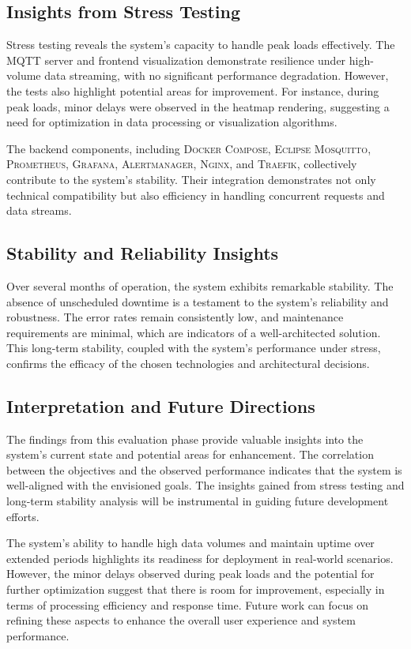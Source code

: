 \subsection{Insights from Stress Testing}
Stress testing reveals the system's capacity to handle peak loads effectively. The MQTT server and frontend visualization demonstrate resilience under high-volume data streaming, with no significant performance degradation. However, the tests also highlight potential areas for improvement. For instance, during peak loads, minor delays were observed in the heatmap rendering, suggesting a need for optimization in data processing or visualization algorithms.

The backend components, including \textsc{Docker Compose}, \textsc{Eclipse Mosquitto}, \textsc{Prometheus}, \textsc{Grafana}, \textsc{Alertmanager}, \textsc{Nginx}, and \textsc{Traefik}, collectively contribute to the system's stability. Their integration demonstrates not only technical compatibility but also efficiency in handling concurrent requests and data streams.

\subsection{Stability and Reliability Insights}
Over several months of operation, the system exhibits remarkable stability. The absence of unscheduled downtime is a testament to the system's reliability and robustness. The error rates remain consistently low, and maintenance requirements are minimal, which are indicators of a well-architected solution. This long-term stability, coupled with the system's performance under stress, confirms the efficacy of the chosen technologies and architectural decisions.

\subsection{Interpretation and Future Directions}
The findings from this evaluation phase provide valuable insights into the system's current state and potential areas for enhancement. The correlation between the objectives and the observed performance indicates that the system is well-aligned with the envisioned goals. The insights gained from stress testing and long-term stability analysis will be instrumental in guiding future development efforts.

The system's ability to handle high data volumes and maintain uptime over extended periods highlights its readiness for deployment in real-world scenarios. However, the minor delays observed during peak loads and the potential for further optimization suggest that there is room for improvement, especially in terms of processing efficiency and response time. Future work can focus on refining these aspects to enhance the overall user experience
and system performance.

